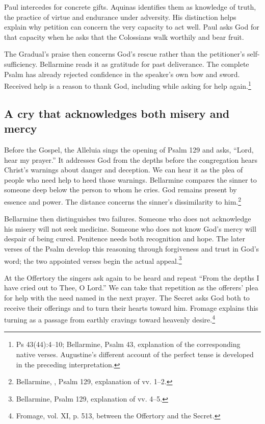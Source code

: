 Paul intercedes for concrete gifts. Aquinas identifies them as
knowledge of truth, the practice of virtue and endurance under
adversity. His distinction helps explain why petition can
concern the very capacity to act well. Paul asks God for that
capacity when he asks that the Colossians walk worthily and bear
fruit.

The Gradual's praise then concerns God's rescue rather
than the petitioner's self-sufficiency. Bellarmine reads
it as gratitude for past deliverance. The complete
Psalm has already rejected confidence in the speaker's
own bow and sword. Received help is a reason to thank
God, including while asking for help again.\footnote{Ps
43(44):4--10; Bellarmine, Psalm 43, explanation of the
corresponding native verses. Augustine's different account
of the perfect tense is developed in the preceding interpretation.}

\subsection{A cry that acknowledges both misery and mercy}

Before the Gospel, the Alleluia sings the opening of Psalm 129
and asks, ``Lord, hear my prayer.'' It addresses God from the
depths before the congregation hears Christ's warnings about
danger and deception. We can hear it as the plea of people who
need help to heed those warnings. Bellarmine compares the sinner to
someone deep below the person to whom he cries. God remains present
by essence and power. The distance concerns the sinner's dissimilarity
to him.\footnote{Bellarmine,
, Psalm 129,
explanation of vv. 1--2.}

Bellarmine then distinguishes two failures. Someone
who does not acknowledge his misery will not seek
medicine. Someone who does not know God's mercy
will despair of being cured. Penitence needs both
recognition and hope. The later verses of the
Psalm develop this reasoning through forgiveness
and trust in God's word; the two appointed
verses begin the actual appeal.\footnote{Bellarmine,
Psalm 129, explanation of vv. 4--5.}

At the Offertory the singers ask again to be heard and repeat
``From the depths I have cried out to Thee, O Lord.'' We can take
that repetition as the offerers' plea for help with the need named
in the next prayer. The Secret asks God both to receive their
offerings and to turn their hearts toward him. Fromage explains
this turning as a passage from earthly cravings toward heavenly
desire.\footnote{Fromage, vol. XI, p. 513, between the Offertory
and the Secret.}

